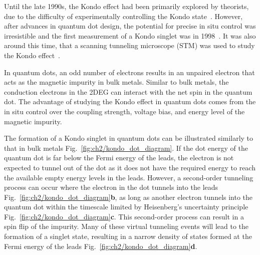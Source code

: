 Until the late 1990s, the Kondo effect had been primarily explored by theorists, due to the difficulty of experimentally controlling the Kondo state~\cite{kondo_review}. However, after advances in quantum dot design, the potential for precise in situ control was irresistible and the first measurement of a Kondo singlet was in 1998~\cite{goldhaber_first_kondo}. It was also around this time, that a scanning tunneling microscope (STM) was used to study the Kondo effect~\cite{stm_kondo}.

In quantum dots, an odd number of electrons results in an unpaired electron that acts as the magnetic impurity in bulk metals. Similar to bulk metals, the conduction electrons in the 2DEG can interact with the net spin in the quantum dot. The advantage of studying the Kondo effect in quantum dots comes from the in situ control over the coupling strength, voltage bias, and energy level of the magnetic impurity.

The formation of a Kondo singlet in quantum dots can be illustrated similarly to that in bulk metals Fig.~\ref{fig:ch2/kondo_dot_diagram}. 
If the dot energy of the quantum dot is far below the Fermi energy of the leads, the electron is not expected to tunnel out of the dot as it does not have the required energy to reach the available empty energy levels in the leads. However, a second-order tunneling process can occur where the electron in the dot tunnels into the leads Fig.~\ref{fig:ch2/kondo_dot_diagram}\textbf{b}, as long as another electron tunnels into the quantum dot within the timescale limited by Heisenberg’s uncertainty principle Fig.~\ref{fig:ch2/kondo_dot_diagram}\textbf{c}. This second-order process can result in a spin flip of the impurity. Many of these virtual tunneling events will lead to the formation of a singlet state, resulting in a narrow density of states formed at the Fermi energy of the leads Fig.~\ref{fig:ch2/kondo_dot_diagram}\textbf{d}. 


